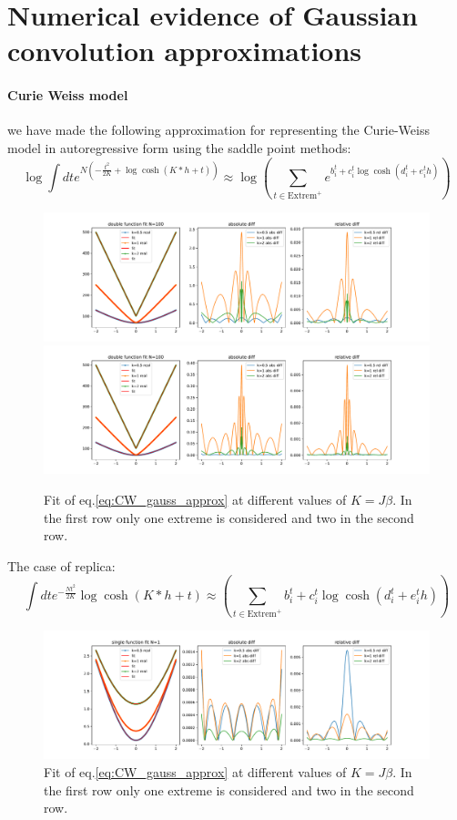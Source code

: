 \documentclass{article}
\begin{document}
\section{Numerical evidence of Gaussian convolution approximations}
\paragraph{Curie Weiss model}
we have made the following approximation for representing the Curie-Weiss model in autoregressive form using the saddle point methods:
\[
\log \int dt e^{N(-\frac{t^2}{2K}+\log\cosh(K*h+t))} \approx \log\left(\sum_{t \in \text{Extrem}^+}  e^{b_i^t + c_i^t\log\cosh(d_i^t+e_i^t h)}\right)
\label{eq:CW_gauss_approx}
\]
\begin{figure}[h]
    \centering
    \includegraphics[width=1\textwidth]{img/CW_fit_N100.pdf}
    \includegraphics[width=1\textwidth]{img/CW_fit2_N100.pdf}
    \caption{Fit of eq.\ref{eq:CW_gauss_approx} at different values of $K=J\beta$. In the first row only one extreme is considered and two in the second row.}
    \label{fig:mesh1}
\end{figure}
The case of replica:
\[
 \int dt e^{-\frac{Nt^2}{2K}}\log\cosh(K*h+t) \approx \left(\sum_{t \in \text{Extrem}^+}  b_i^t + c_i^t\log\cosh(d_i^t+e_i^t h)\right)
\label{eq:CW_gauss_approx2}
\]

\begin{figure}[h]
    \centering
    \includegraphics[width=1\textwidth]{img/RFIM_fit.pdf}
    \caption{Fit of eq.\ref{eq:CW_gauss_approx} at different values of $K=J\beta$. In the first row only one extreme is considered and two in the second row.}
    \label{fig:gauss_approx}
\end{figure}
\end{document}
